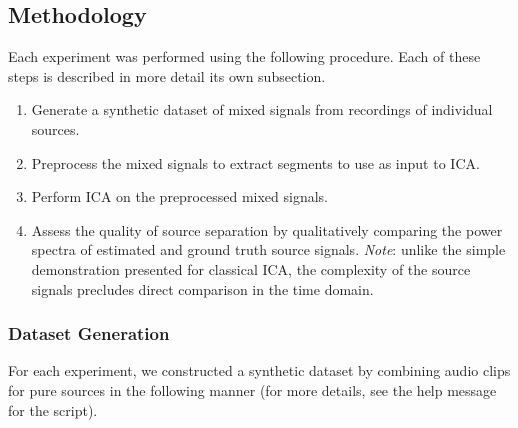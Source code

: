 \documentclass[10pt]{article}
\begin{document}
\subsection*{Methodology}
Each experiment was performed using the following procedure. Each of these steps is
described in more detail its own subsection.

\begin{enumerate}
    \item Generate a synthetic dataset of mixed signals from recordings of individual
        sources.

    \item Preprocess the mixed signals to extract segments to use as input to ICA.

    \item Perform ICA on the preprocessed mixed signals.

    \item Assess the quality of source separation by qualitatively comparing the power
        spectra of estimated and ground truth source signals. \emph{Note}: unlike the
        simple demonstration presented for classical ICA, the complexity of the source
        signals precludes direct comparison in the time domain.
\end{enumerate}

\subsubsection*{Dataset Generation}
For each experiment, we constructed a synthetic dataset by combining audio clips for pure
sources in the following manner (for more details, see the help message for the
 script).
\end{document}
